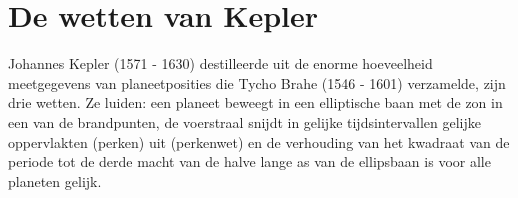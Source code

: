 \documentclass{ximera}
\begin{document}
	\author{Bart Lambregs}

	
\section{De wetten van Kepler}

Johannes Kepler (1571 - 1630) destilleerde uit de enorme hoeveelheid meetgegevens van planeetposities die Tycho Brahe (1546 - 1601) verzamelde, zijn drie wetten. Ze luiden: een planeet beweegt in een elliptische baan met de zon in een van de brandpunten, de voerstraal snijdt in gelijke tijdsintervallen gelijke oppervlakten (perken) uit (perkenwet) en de verhouding van het kwadraat van de periode tot de derde macht van de halve lange as van de ellipsbaan is voor alle planeten gelijk.
	
	
\end{document}
